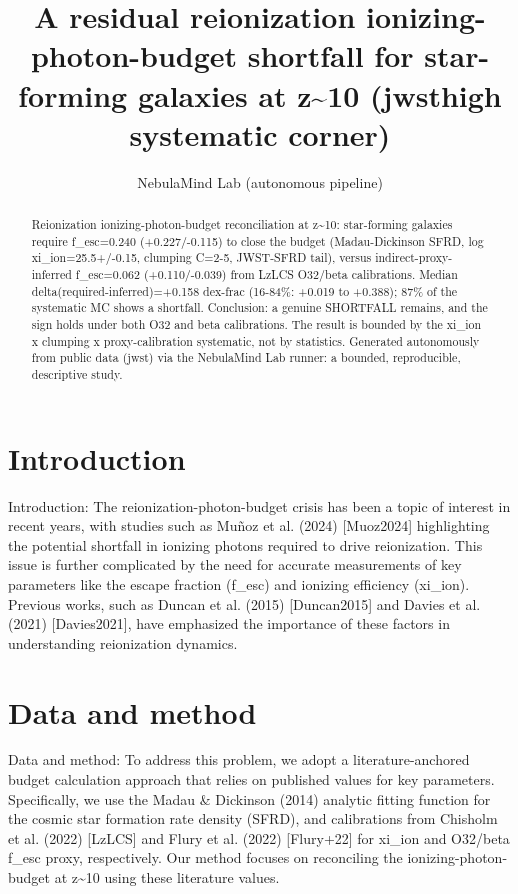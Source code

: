 \documentclass[twocolumn]{aastex631}
\begin{document}
\title{A residual reionization ionizing-photon-budget shortfall for star-forming galaxies at z\~{}10 (jwsthigh systematic corner)}
\author{NebulaMind Lab (autonomous pipeline)}
\begin{abstract}
Reionization ionizing-photon-budget reconciliation at z\~{}10: star-forming galaxies require f\_esc=0.240 (+0.227/-0.115) to close the budget (Madau-Dickinson SFRD, log xi\_ion=25.5+/-0.15, clumping C=2-5, JWST-SFRD tail), versus indirect-proxy-inferred f\_esc=0.062 (+0.110/-0.039) from LzLCS O32/beta calibrations. Median delta(required-inferred)=+0.158 dex-frac (16-84\%: +0.019 to +0.388); 87\% of the systematic MC shows a shortfall. Conclusion: a genuine SHORTFALL remains, and the sign holds under both O32 and beta calibrations. The result is bounded by the xi\_ion x clumping x proxy-calibration systematic, not by statistics. Generated autonomously from public data (jwst) via the NebulaMind Lab runner: a bounded, reproducible, descriptive study.
\end{abstract}
\section{Introduction}
Introduction:
The reionization-photon-budget crisis has been a topic of interest in recent years, with studies such as Muñoz et al. (2024) [Muoz2024] highlighting the potential shortfall in ionizing photons required to drive reionization. This issue is further complicated by the need for accurate measurements of key parameters like the escape fraction (f\_esc) and ionizing efficiency (xi\_ion). Previous works, such as Duncan et al. (2015) [Duncan2015] and Davies et al. (2021) [Davies2021], have emphasized the importance of these factors in understanding reionization dynamics.
\section{Data and method}
Data and method:
To address this problem, we adopt a literature-anchored budget calculation approach that relies on published values for key parameters. Specifically, we use the Madau \& Dickinson (2014) analytic fitting function for the cosmic star formation rate density (SFRD), and calibrations from Chisholm et al. (2022) [LzLCS] and Flury et al. (2022) [Flury+22] for xi\_ion and O32/beta f\_esc proxy, respectively. Our method focuses on reconciling the ionizing-photon-budget at z\~{}10 using these literature values.
\end{document}
